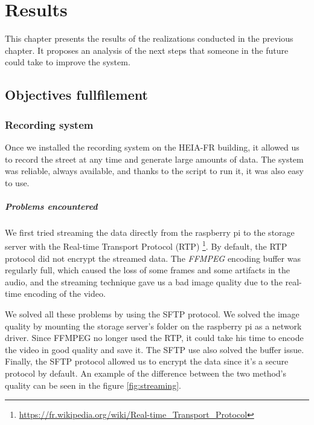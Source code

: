 \chapter{Results}
\label{ch:results}

This chapter presents the results of the realizations conducted in the previous chapter. It proposes an analysis of the next steps that someone in the future could take to improve the system.

\section{Objectives fullfilement}
\subsection{Recording system}

Once we installed the recording system on the HEIA-FR building, it allowed us to record the street at any time and generate large amounts of data. The system was reliable, always available, and thanks to the script to run it, it was also easy to use.

\paragraph*{Problems encountered}

We first tried streaming the data directly from the raspberry pi to the storage server with the Real-time Transport Protocol (RTP) \footnote{\url{https://fr.wikipedia.org/wiki/Real-time\_Transport\_Protocol}}. By default, the RTP protocol did not encrypt the streamed data. The \textit{FFMPEG} encoding buffer was regularly full, which caused the loss of some frames and some artifacts in the audio, and the streaming technique gave us a bad image quality due to the real-time encoding of the video.

We solved all these problems by using the SFTP protocol. We solved the image quality by mounting the storage server's folder on the raspberry pi as a network driver. Since FFMPEG no longer used the RTP, it could take his time to encode the video in good quality and save it. The SFTP use also solved the buffer issue. Finally, the SFTP protocol allowed us to encrypt the data since it's a secure protocol by default. An example of the difference between the two method's quality can be seen in the figure \ref{fig:streaming}.

